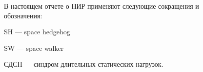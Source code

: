 В настоящем отчете о НИР применяют следующие сокращения и \\обозначения:

\noindent SH --- space hedgehog

\noindent SW --- space walker

\noindent СДСН --- синдром длительных статических нагрузок.

\pagebreak
